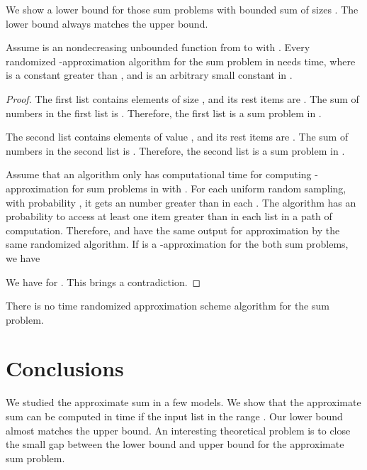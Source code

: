 \documentclass[runningheads]{llncs}
\begin{document}
We show a lower bound for those sum problems with bounded sum of
sizes . The lower bound always matches the upper
bound.


\begin{theorem}\label{strong-lower-bound-theorem}  Assume  is
an nondecreasing unbounded function from  to  with
. Every randomized -approximation
algorithm for the sum problem in  needs
 time, where  is a constant greater than
, and  is an arbitrary small constant in
.
\end{theorem}

\begin{proof}
The first list  contains  elements of size ,
and its rest  items are  . The sum of numbers in the
first list is . Therefore, the first list is a sum
problem in .


The second list  contains  elements of value , and its
rest  items are  . The sum of numbers in the second list
is . Therefore, the second list is a sum problem in
.


Assume that an algorithm only has computational time  for computing -approximation for sum problems in  with . For each uniform random
sampling, with probability , it gets an number
greater than  in each . The algorithm has an 
probability to access at least one item greater than  in each
list in a path of computation. Therefore,   and  have the
same output for approximation by the same randomized algorithm.  If
 is a -approximation for the both sum problems, we have


We have  for .
This brings  a contradiction.

\end{proof}

\begin{corollary}
There is no  time randomized
approximation scheme algorithm for the sum problem.
\end{corollary}



\section{Conclusions}

We studied the approximate sum in a few models. We show that the
approximate sum can be computed in time  if the
input list in the range . Our lower bound almost matches the
upper bound. An interesting theoretical problem is to close the
small gap between the lower bound and upper bound for the
approximate sum problem.
\end{document}
